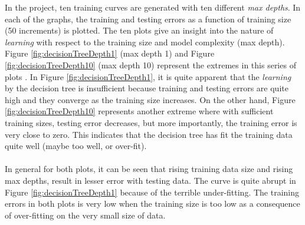 \documentclass{article}
\begin{document}
	In the project, ten training curves are generated with ten different \emph{max depths}. In each of the graphs, the training and testing errors as a function of training size (50 increments) is plotted. The ten plots give an insight into the nature of \emph{learning} with respect to the training size and model complexity (max depth). Figure \ref{fig:decisionTreeDepth1} (max depth 1) and Figure \ref{fig:decisionTreeDepth10} (max depth 10) represent the extremes in this series of plots . In Figure \ref{fig:decisionTreeDepth1}, it is quite apparent that the \emph{learning} by the decision tree is insufficient because training and testing errors are quite high and they converge as the training size increases. On the other hand, Figure \ref{fig:decisionTreeDepth10} represents another extreme where with sufficient training sizes, testing error decreases, but more importantly, the training error is very close to zero. This indicates that the decision tree has fit the training data quite well (maybe  too well, or over-fit). 
	\paragraph{}In general for both plots, it can be seen that rising training data size and rising max depths, result in lesser error with testing data. The curve is quite abrupt in Figure \ref{fig:decisionTreeDepth1} because of the terrible under-fitting. The training errors in both plots is very low when the training size is too low as a consequence of over-fitting on the very small size of data.
\end{document}
